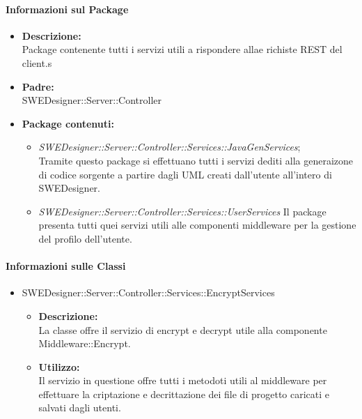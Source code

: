 		\paragraph{Informazioni sul Package}
		\begin{itemize}
			\item \textbf{Descrizione: }\\
			Package contenente tutti i servizi utili a rispondere allae richiste REST del client.s
			\item \textbf{Padre: }\\ SWEDesigner::Server::Controller
			\item \textbf{Package contenuti: }
			\begin{itemize}
				\item \emph{SWEDesigner::Server::Controller::Services::JavaGenServices};\\
				Tramite questo package si effettuano tutti i servizi dediti alla generaizone di codice sorgente a partire dagli UML creati dall'utente
				all'intero di SWEDesigner.
				\item \emph{SWEDesigner::Server::Controller::Services::UserServices}
				Il package presenta tutti quei servizi utili alle componenti middleware per la gestione del profilo dell'utente.
			\end{itemize}
		\end{itemize}
		\paragraph{Informazioni sulle Classi}
		\begin{itemize}
			\item SWEDesigner::Server::Controller::Services::EncryptServices
			\begin{itemize}
				\item \textbf{Descrizione: }\\
				La classe offre il servizio di encrypt e decrypt utile alla componente Middleware::Encrypt.
				\item \textbf{Utilizzo: }\\
				Il servizio in questione offre tutti i metodoti utili al middleware per effettuare la criptazione e decrittazione dei file di progetto caricati e salvati dagli utenti.
			\end{itemize}
		\end{itemize}

